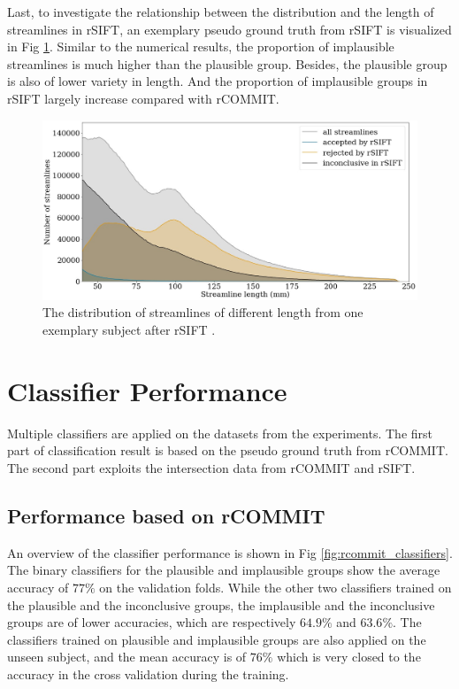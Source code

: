 Last, to investigate the relationship between the distribution and the length of streamlines in rSIFT, an exemplary 
pseudo ground truth from rSIFT is visualized in Fig \ref*{fig:threegroup_sift}. Similar to the numerical results,
the proportion of implausible streamlines is much higher than the plausible group. Besides, the plausible group is also of lower variety in length.
And the proportion of implausible groups in rSIFT largely increase compared with rCOMMIT.

\begin{figure}[ht]
    \centering
    \includegraphics[width= 12cm]{figures/distribution_sift.png}
    \caption{The distribution of streamlines of different length from one exemplary subject after rSIFT \cite{hainAssessingStreamlinePlausibility2022}. }
\label{fig:threegroup_sift}
\end{figure}


\section{Classifier Performance}
Multiple classifiers are applied on the datasets from the experiments. The first part of classification result
is based on the pseudo ground truth from rCOMMIT. The second part exploits the intersection data from rCOMMIT and rSIFT.
\subsection{Performance based on rCOMMIT}

An overview of the classifier performance is shown in Fig \ref{fig:rcommit_classifiers}.
The binary classifiers for the plausible and implausible groups show the average accuracy
of $77\%$ on the validation folds. While the other two classifiers trained on the 
plausible and the inconclusive groups, the implausible and the inconclusive groups are 
of lower accuracies, which are respectively $64.9\%$ and $63.6\%$. 
The classifiers trained on plausible and implausible groups are also applied on the unseen subject, 
and the mean accuracy is of $76\%$ which is very closed to the accuracy in the cross validation during the training.


